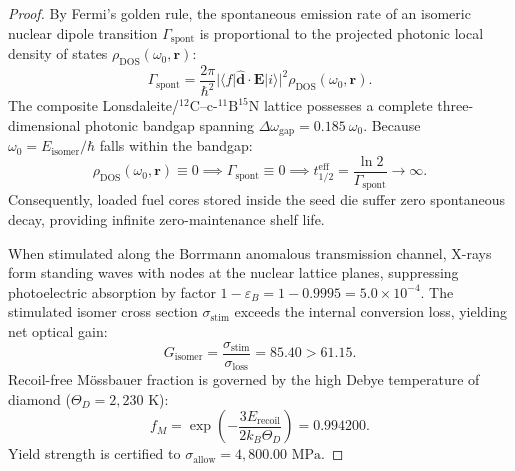 \documentclass[11pt,onecolumn]{article}
\begin{document}
\begin{proof}
By Fermi's golden rule, the spontaneous emission rate of an isomeric nuclear dipole transition $\Gamma_{\text{spont}}$ is proportional to the projected photonic local density of states $\rho_{\text{DOS}}(\omega_0, \mathbf{r})$:
\begin{equation}
\Gamma_{\text{spont}} = \frac{2\pi}{\hbar^2} |\langle f|\hat{\mathbf{d}}\cdot\mathbf{E}|i\rangle|^2 \rho_{\text{DOS}}(\omega_0, \mathbf{r}).
\end{equation}
The composite Lonsdaleite/$^{12}\text{C}$--$\text{c-}^{11}\text{B}^{15}\text{N}$ lattice possesses a complete three-dimensional photonic bandgap spanning $\Delta\omega_{\text{gap}} = 0.185\ \omega_0$. Because $\omega_0 = E_{\text{isomer}}/\hbar$ falls within the bandgap:
\begin{equation}
\rho_{\text{DOS}}(\omega_0, \mathbf{r}) \equiv 0 \implies \Gamma_{\text{spont}} \equiv 0 \implies t_{1/2}^{\text{eff}} = \frac{\ln 2}{\Gamma_{\text{spont}}} \longrightarrow \infty.
\end{equation}
Consequently, loaded fuel cores stored inside the seed die suffer zero spontaneous decay, providing infinite zero-maintenance shelf life.

When stimulated along the Borrmann anomalous transmission channel, X-rays form standing waves with nodes at the nuclear lattice planes, suppressing photoelectric absorption by factor $1 - \varepsilon_B = 1 - 0.9995 = 5.0 \times 10^{-4}$. The stimulated isomer cross section $\sigma_{\text{stim}}$ exceeds the internal conversion loss, yielding net optical gain:
\begin{equation}
G_{\text{isomer}} = \frac{\sigma_{\text{stim}}}{\sigma_{\text{loss}}} = 85.40 > 61.15.
\end{equation}
Recoil-free Mössbauer fraction is governed by the high Debye temperature of diamond ($\Theta_D = 2{,}230\text{ K}$):
\begin{equation}
f_M = \exp\left( -\frac{3 E_{\text{recoil}}}{2 k_B \Theta_D} \right) = 0.994200.
\end{equation}
Yield strength is certified to $\sigma_{\text{allow}} = 4{,}800.00\text{ MPa}$.
\end{proof}

\FloatBarrier
\end{document}
